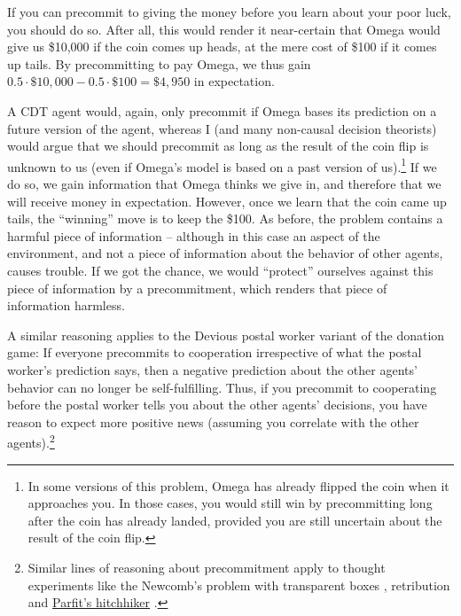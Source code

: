 If you can precommit to giving the money before you learn about your
poor luck, you should do so. After all, this would render it
near-certain that Omega would give us \$10,000 if the coin comes up
heads, at the mere cost of \$100 if it comes up tails. By precommitting to
pay Omega, we thus gain
$0.5 \cdot \$ 10{,}000  - 0.5 \cdot \$ 100 = \$ 4{,}950$ in
expectation.

A CDT agent would, again, only precommit if Omega bases its prediction on
a future version of the agent, whereas I (and many non-causal decision
theorists) would argue that we should precommit as long as the result of
the coin flip is unknown to us (even if Omega's model is based on a past
version of us).\footnote{In some versions of this problem, Omega has
  already flipped the coin when it approaches you. In those cases, you
  would still win by precommitting long after the coin has already
  landed, provided you are still uncertain about the result of the coin
  flip.} If we do so, we gain information that Omega thinks we give in,
and therefore that we will receive money in expectation. However, once
we learn that the coin came up tails, the ``winning'' move is to keep
the \$100. As before, the problem contains a harmful piece of
information -- although in this case an aspect of the environment, and
not a piece of information about the behavior of other agents, causes
trouble. If we got the chance, we would ``protect'' ourselves against
this piece of information by a precommitment, which renders that piece
of information harmless.

A similar reasoning applies to the Devious postal worker variant of the
donation game: If everyone precommits to cooperation irrespective of
what the postal worker's prediction says, then a negative prediction
about the other agents' behavior can no longer be self-fulfilling. Thus,
if you precommit to cooperating before the postal worker tells you about
the other agents' decisions, you have reason to expect more positive
news (assuming you correlate with the other agents).\footnote{Similar
  lines of reasoning about precommitment apply to thought experiments
  like the Newcomb's problem with transparent boxes
  \parencite{Drescher2006-ky}, retribution
  \parencite{Drescher2006-ky} and
  \href{https://wiki.lesswrong.com/wiki/Parfit\%27s_hitchhiker}{Parfit's
  hitchhiker} \parencite{Parfit1984-ne}.}

